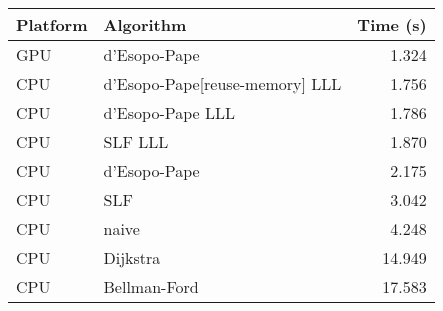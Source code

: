 \begin{tabular}{llr}
  \hline
  Platform & Algorithm & Time (s) \\
  \hline
  GPU & d'Esopo-Pape & 1.324 \\
  CPU & d'Esopo-Pape[reuse-memory] LLL & 1.756 \\
  CPU & d'Esopo-Pape LLL & 1.786 \\
  CPU & SLF LLL & 1.870 \\
  CPU & d'Esopo-Pape & 2.175 \\
  CPU & SLF & 3.042 \\
  CPU & naive & 4.248 \\
  CPU & Dijkstra & 14.949 \\
  CPU & Bellman-Ford & 17.583 \\
  \hline
\end{tabular}
